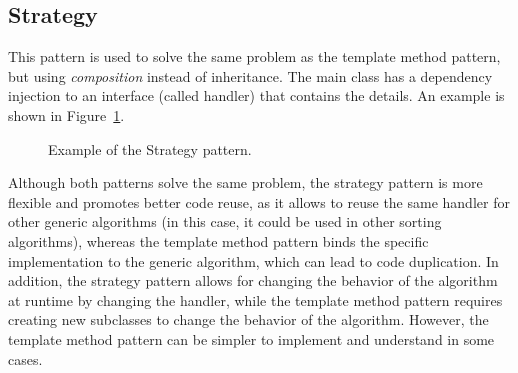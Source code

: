 \subsection{Strategy}

This pattern is used to solve the same problem as the template method pattern, but using \emph{composition} instead of inheritance. The main class has a dependency injection to an interface (called handler) that contains the details. An example is shown in Figure~\ref{fig:strategy}.
\begin{figure}
    \centering
    \caption{Example of the Strategy pattern.}
    \label{fig:strategy}
\end{figure}

Although both patterns solve the same problem, the strategy pattern is more flexible and promotes better code reuse, as it allows to reuse the same handler for other generic algorithms (in this case, it could be used in other sorting algorithms), whereas the template method pattern binds the specific implementation to the generic algorithm, which can lead to code duplication. In addition, the strategy pattern allows for changing the behavior of the algorithm at runtime by changing the handler, while the template method pattern requires creating new subclasses to change the behavior of the algorithm. However, the template method pattern can be simpler to implement and understand in some cases.

